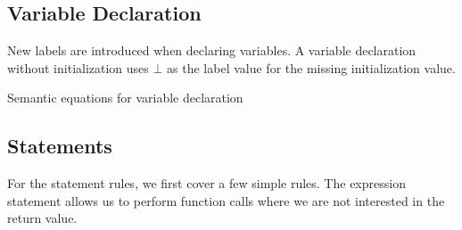 \subsection{Variable Declaration}
New labels are introduced when declaring variables.
A variable declaration without initialization uses $\bot$ as the label value for the missing initialization value.

\begin{table}[H]
\begin{semanticequations}
 \seSpace
\end{semanticequations}
\caption{Semantic equations for variable declaration}
\label{cstr:variabledeclaration}
\end{table}

\subsection{Statements}
For the statement rules, we first cover a few simple rules.
The expression statement allows us to perform function calls where we are not interested in the return value.

